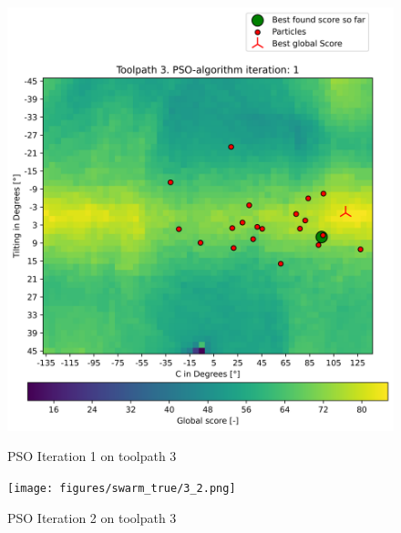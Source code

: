 \begin{figure}[H]
	\centering
	\begin{minipage}{0.5\textwidth}
		\includegraphics[width=\textwidth]{figures/swarm_true/3_1.png}
		\caption{PSO Iteration 1 on toolpath 3}
		\label{1_true}
	\end{minipage}\hfill
	\begin{minipage}{0.5\textwidth}
		\texttt{[image: figures/swarm\_true/3\_2.png]}
		\caption{PSO Iteration 2 on toolpath 3}
		\label{2_true}
	\end{minipage}\par
\end{figure}	

